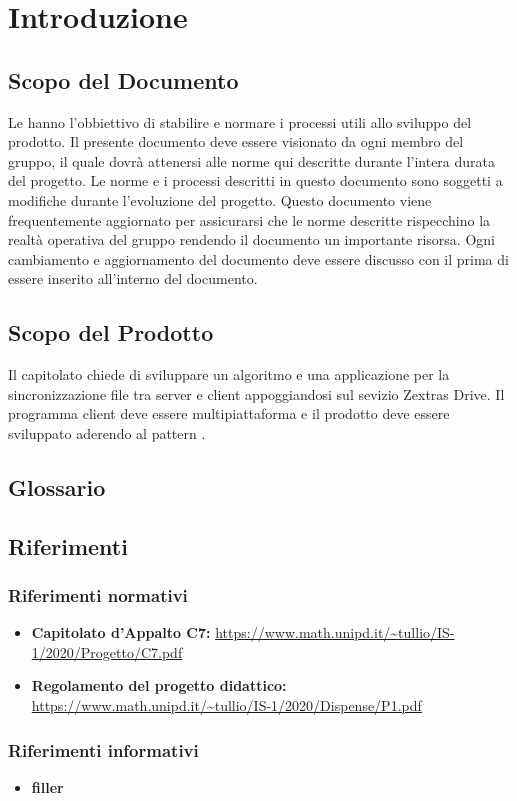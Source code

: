 \section{Introduzione}
\subsection{Scopo del Documento}
Le \NdP{} hanno l'obbiettivo di stabilire e normare i processi utili allo sviluppo del prodotto.
Il presente documento deve essere visionato da ogni membro del gruppo, il quale dovrà attenersi alle norme qui descritte durante l'intera durata del progetto.
Le norme e i processi descritti in questo documento sono soggetti a modifiche durante l'evoluzione del progetto.
Questo documento viene frequentemente aggiornato per assicurarsi che le norme descritte rispecchino la realtà operativa del gruppo rendendo il documento un importante risorsa.
Ogni cambiamento e aggiornamento del documento deve essere discusso con il \RdP{} prima di essere inserito all'interno del documento.
\subsection{Scopo del Prodotto}
Il capitolato chiede di sviluppare un algoritmo e una applicazione per la sincronizzazione file tra server e client appoggiandosi sul sevizio Zextras Drive.
Il programma client deve essere multipiattaforma e il prodotto deve essere sviluppato aderendo al pattern .
\subsection{Glossario}
\subsection{Riferimenti}
\subsubsection{Riferimenti normativi}
\begin{itemize}
	\item \textbf{Capitolato d'Appalto C7:} \url{https://www.math.unipd.it/~tullio/IS-1/2020/Progetto/C7.pdf}
	\item \textbf{Regolamento del progetto didattico:} \url{https://www.math.unipd.it/~tullio/IS-1/2020/Dispense/P1.pdf}
\end{itemize}
\subsubsection{Riferimenti informativi}
\begin{itemize}
	\item \textbf{filler}
\end{itemize}

